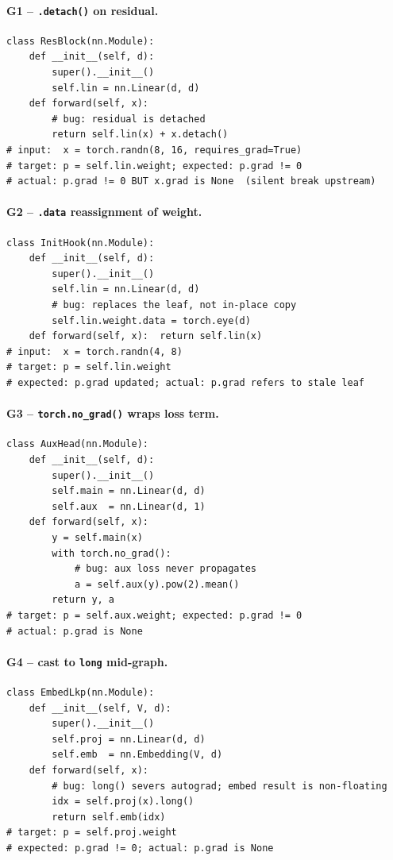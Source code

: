 \documentclass{article}
\begin{document}
\paragraph{G1 -- \texttt{.detach()} on residual.}
\begin{lstlisting}
class ResBlock(nn.Module):
    def __init__(self, d):
        super().__init__()
        self.lin = nn.Linear(d, d)
    def forward(self, x):
        # bug: residual is detached
        return self.lin(x) + x.detach()
# input:  x = torch.randn(8, 16, requires_grad=True)
# target: p = self.lin.weight; expected: p.grad != 0
# actual: p.grad != 0 BUT x.grad is None  (silent break upstream)
\end{lstlisting}

\paragraph{G2 -- \texttt{.data} reassignment of weight.}
\begin{lstlisting}
class InitHook(nn.Module):
    def __init__(self, d):
        super().__init__()
        self.lin = nn.Linear(d, d)
        # bug: replaces the leaf, not in-place copy
        self.lin.weight.data = torch.eye(d)
    def forward(self, x):  return self.lin(x)
# input:  x = torch.randn(4, 8)
# target: p = self.lin.weight
# expected: p.grad updated; actual: p.grad refers to stale leaf
\end{lstlisting}

\paragraph{G3 -- \texttt{torch.no\_grad()} wraps loss term.}
\begin{lstlisting}
class AuxHead(nn.Module):
    def __init__(self, d):
        super().__init__()
        self.main = nn.Linear(d, d)
        self.aux  = nn.Linear(d, 1)
    def forward(self, x):
        y = self.main(x)
        with torch.no_grad():
            # bug: aux loss never propagates
            a = self.aux(y).pow(2).mean()
        return y, a
# target: p = self.aux.weight; expected: p.grad != 0
# actual: p.grad is None
\end{lstlisting}

\paragraph{G4 -- cast to \texttt{long} mid-graph.}
\begin{lstlisting}
class EmbedLkp(nn.Module):
    def __init__(self, V, d):
        super().__init__()
        self.proj = nn.Linear(d, d)
        self.emb  = nn.Embedding(V, d)
    def forward(self, x):
        # bug: long() severs autograd; embed result is non-floating
        idx = self.proj(x).long()
        return self.emb(idx)
# target: p = self.proj.weight
# expected: p.grad != 0; actual: p.grad is None
\end{lstlisting}
\end{document}
